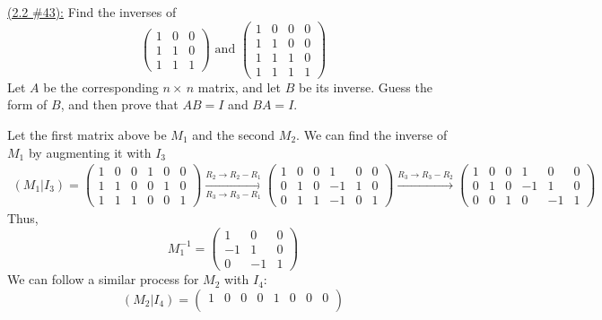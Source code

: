 \documentclass{exam}
\begin{document}
\underline{(2.2 \#43):} Find the inverses of
\[
    \begin{pmatrix}
        1 & 0 & 0 \\
        1 & 1 & 0 \\
        1 & 1 & 1
    \end{pmatrix} 
    \text{ and }
    \begin{pmatrix}
        1 & 0 & 0 & 0 \\
        1 & 1 & 0 & 0 \\
        1 & 1 & 1 & 0 \\
        1 & 1 & 1 & 1 
    \end{pmatrix}
\]
Let $A$ be the corresponding $n\times\,n$ matrix, and let $B$ be its inverse. Guess the form of $B$, and then prove that $AB=I$ and $BA=I$.
\begin{solution}
    Let the first matrix above be $M_1$ and the second $M_2$. We can find the inverse of $M_1$ by augmenting it with $I_3$
    \begin{align*}
        (M_1 | I_3) = \begin{pmatrix}
            1 & 0 & 0 & 1 & 0 & 0 \\
            1 & 1 & 0 & 0 & 1 & 0 \\
            1 & 1 & 1 & 0 & 0 & 1 
        \end{pmatrix}
        \xrightarrow[R_3 \to R_3 - R_1]{R_2 \to R_2 - R_1}
        \begin{pmatrix}
            1 & 0 & 0 & 1 & 0 & 0 \\
            0 & 1 & 0 & -1 & 1 & 0 \\
            0 & 1 & 1 & -1 & 0 & 1 
        \end{pmatrix}
        \xrightarrow{R_3 \to R_3 - R_2}
        \begin{pmatrix}
            1 & 0 & 0 & 1 & 0 & 0 \\
            0 & 1 & 0 & -1 & 1 & 0 \\
            0 & 0 & 1 & 0 & -1 & 1 
        \end{pmatrix}
    \end{align*}
    Thus, 
    \[M_1^{-1} = \begin{pmatrix}
        1 & 0 & 0 \\
        -1 & 1 & 0 \\
        0 & -1 & 1
    \end{pmatrix}\]
    We can follow a similar process for $M_2$ with $I_4$:
    \[
        (M_2 | I_4) = \begin{pmatrix}
            1 & 0 & 0 & 0 & 1 & 0 & 0 & 0 \\

\end{pmatrix}\]
\end{solution}
\end{document}
